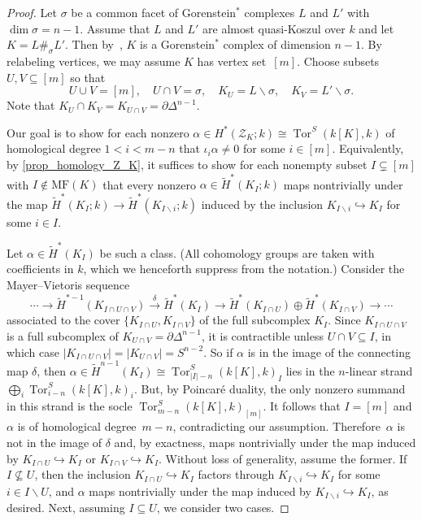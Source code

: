 \documentclass[a4paper,10pt]{amsart}
\theoremstyle{definition}
\theoremstyle{remark}
\DeclareMathOperator{\Tor}{Tor}
\begin{document}
\begin{proof}
Let $\sigma$ be a common facet of Gorenstein$^*$ complexes $L$ and $L'$ with $\dim\sigma=n-1$. Assume that $L$ and $L'$ are almost quasi-Koszul over $k$ and let $K=L\#_\sigma L'$. Then by~\cite[Corollary~3.10]{MM}, $K$ is a Gorenstein$^*$ complex of dimension $n-1$. By relabeling vertices, we may assume $K$ has vertex set~$[m]$. Choose subsets $U,V\subseteq [m]$ so that
\[ U\cup V=[m], \quad U\cap V=\sigma, \quad K_U=L\smallsetminus\sigma, \quad K_V=L'\smallsetminus\sigma. \]
Note that $K_U\cap K_V=K_{U\cap V}=\partial\Delta^{n-1}$. 

Our goal is to show for each nonzero $\alpha \in H^*(\mathcal{Z}_K;k)\cong \Tor^S(k[K],k)$ of homological degree $1<i<m-n$ that $\iota_i\alpha \neq 0$ for some $i\in[m]$. Equivalently, by \cref{prop_homology_Z_K}, it suffices to show for each nonempty subset $I\subsetneq [m]$ with $I\notin \mathrm{MF}(K)$ that every nonzero $\alpha \in \widetilde{H}^*(K_I;k)$ maps nontrivially under the map $\widetilde{H}^*(K_I;k) \to \widetilde{H}^*(K_{I\smallsetminus i};k)$ induced by the inclusion $K_{I\smallsetminus i} \hookrightarrow K_I$ for some $i\in I$. 

Let $\alpha \in \widetilde{H}^*(K_I)$ be such a class. (All cohomology groups are taken with coefficients in $k$, which we henceforth suppress from the notation.) Consider the Mayer--Vietoris sequence
\[ 
\cdots\longrightarrow \widetilde{H}^{*-1}(K_{I\cap U\cap V}) \stackrel{\delta}{\longrightarrow} \widetilde{H}^*(K_I) \longrightarrow \widetilde{H}^*(K_{I\cap U})\oplus\widetilde{H}^*(K_{I\cap V}) \longrightarrow\cdots
\]
associated to the cover $\{K_{I\cap U}, K_{I\cap V}\}$ of the full subcomplex $K_I$. Since $K_{I\cap U\cap V}$ is a full subcomplex of $K_{U\cap V}=\partial\Delta^{n-1}$, it is contractible unless $U\cap V\subseteq I$, in which case $|K_{I\cap U\cap V}|=|K_{U\cap V}|=S^{n-2}$. So if $\alpha$ is in the image of the connecting map $\delta$, then $\alpha\in \widetilde{H}^{n-1}(K_I) \cong \Tor^S_{|I|-n}(k[K],k)_I$ lies in the $n$-linear strand $\bigoplus_i\Tor^S_{i-n}(k[K],k)_i$. But, by Poincar\'e duality, the only nonzero summand in this strand is the socle $\Tor^S_{m-n}(k[K],k)_{[m]}$. It follows that $I=[m]$ and $\alpha$ is of homological degree~$m-n$, contradicting our assumption. Therefore~$\alpha$ is not in the image of $\delta$ and, by exactness, maps nontrivially under the map induced by $K_{I\cap U} \hookrightarrow K_I$ or $K_{I\cap V} \hookrightarrow K_I$. Without loss of generality, assume the former. If $I\not\subseteq U$, then the inclusion $K_{I\cap U} \hookrightarrow K_I$ factors through $K_{I\smallsetminus i} \hookrightarrow K_I$ for some $i\in I\smallsetminus U$, and $\alpha$ maps nontrivially under the map induced by $K_{I\smallsetminus i} \hookrightarrow K_I$, as desired. Next, assuming $I\subseteq U$, we consider two cases.


\end{proof}
\end{document}
